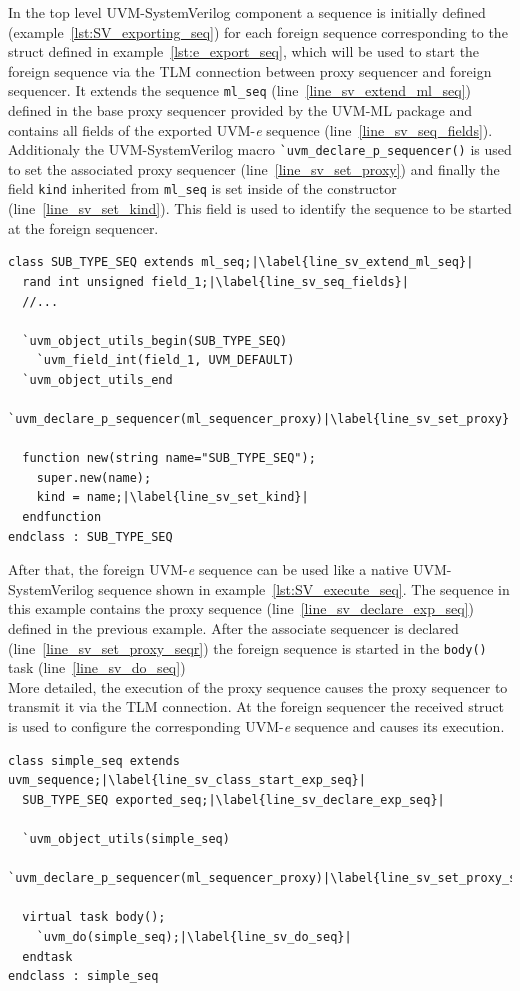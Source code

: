 In the top level UVM-SystemVerilog component a sequence is initially defined (example~\ref{lst:SV_exporting_seq}) for each foreign sequence corresponding to the struct defined in example~\ref{lst:e_export_seq}, which will be used to start the foreign sequence via the TLM connection between proxy sequencer and foreign sequencer. It extends the sequence \lstinline$ml_seq$ (line~\ref{line_sv_extend_ml_seq}) defined in the base proxy sequencer provided by the UVM-ML package and contains all fields of the exported UVM-\textit{e} sequence (line~\ref{line_sv_seq_fields}). Additionaly the UVM-SystemVerilog macro \lstinline$`uvm_declare_p_sequencer()$ is used to set the associated proxy sequencer (line~\ref{line_sv_set_proxy}) and finally the field \lstinline$kind$ inherited from \lstinline$ml_seq$ is set inside of the constructor (line~\ref{line_sv_set_kind}). This field is used to identify the sequence to be started at the foreign sequencer.
\lstset{language=SystemVerilog, numbers = left, escapechar=|, breaklines=true}
\begin{lstlisting}[frame=htrbl, caption={SystemVerilog: exporting the UVM-\textit{e} sequence},
label={lst:SV_exporting_seq}]
class SUB_TYPE_SEQ extends ml_seq;|\label{line_sv_extend_ml_seq}|
  rand int unsigned field_1;|\label{line_sv_seq_fields}|
  //...

  `uvm_object_utils_begin(SUB_TYPE_SEQ)
    `uvm_field_int(field_1, UVM_DEFAULT)
  `uvm_object_utils_end
  `uvm_declare_p_sequencer(ml_sequencer_proxy)|\label{line_sv_set_proxy}|

  function new(string name="SUB_TYPE_SEQ");
    super.new(name);
    kind = name;|\label{line_sv_set_kind}|
  endfunction
endclass : SUB_TYPE_SEQ
\end{lstlisting}
After that, the foreign UVM-\textit{e} sequence can be used like a native UVM-SystemVerilog sequence shown in example~\ref{lst:SV_execute_seq}. The sequence in this example contains the proxy sequence (line~\ref{line_sv_declare_exp_seq}) defined in the previous example. After the associate sequencer is declared (line~\ref{line_sv_set_proxy_seqr}) the foreign sequence is started in the \lstinline$body()$ task (line~\ref{line_sv_do_seq})\\
More detailed, the execution of the proxy sequence causes the proxy sequencer to transmit it via the TLM connection. At the foreign sequencer the received struct is used to configure the corresponding UVM-\textit{e} sequence and causes its execution.
\lstset{language=SystemVerilog, numbers = left, escapechar=|, breaklines=true}
\begin{lstlisting}[frame=htrbl, caption={SystemVerilog: executing the exported UVM-\textit{e} sequence},
label={lst:SV_execute_seq}]
class simple_seq extends uvm_sequence;|\label{line_sv_class_start_exp_seq}|
  SUB_TYPE_SEQ exported_seq;|\label{line_sv_declare_exp_seq}|

  `uvm_object_utils(simple_seq)
  `uvm_declare_p_sequencer(ml_sequencer_proxy)|\label{line_sv_set_proxy_seqr}|

  virtual task body();
    `uvm_do(simple_seq);|\label{line_sv_do_seq}|
  endtask
endclass : simple_seq
\end{lstlisting}
